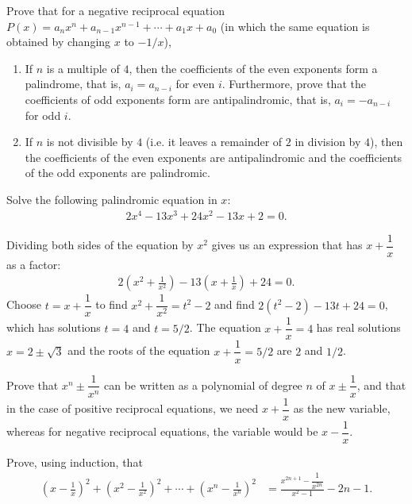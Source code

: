\documentclass[12pt,a4paper]{memoir}
\theoremstyle{definition}
\begin{document}
	\begin{question}
		Prove that for a negative reciprocal equation $P(x)=a_nx^n+a_{n-1}x^{n-1}+\cdots+a_1x+a_0$ (in which the same equation is obtained by changing $x$ to $-1/x$),
		\begin{enumerate}
			\item If $n$ is a multiple of $4$, then the coefficients of the even exponents form a palindrome, that is, $a_i=a_{n-i}$ for even $i$. Furthermore, prove that the coefficients of odd exponents form are antipalindromic, that is, $a_i=-a_{n-i}$ for odd $i$.
			\item If $n$ is not divisible by $4$ (i.e. it leaves a remainder of $2$ in division by $4$), then the coefficients of the even exponents are antipalindromic and the coefficients of the odd exponents are palindromic.
		\end{enumerate}
	\end{question}



\begin{question}
	Solve the following palindromic equation in $x$:
	\begin{align*}
		2x^4-13x^3+24x^2-13x+2=0.
	\end{align*}
\end{question}

\begin{solution}
	Dividing both sides of the equation by $x^2$ gives us an expression that has $x+\dfrac{1}{x}$ as a factor:
	\begin{align*}
		2\left(x^2+\frac{1}{x^2}\right) - 13\left(x+\frac{1}{x}\right) + 24 = 0.
	\end{align*}
	Choose $t=x+\dfrac{1}{x}$ to find $x^2+\dfrac{1}{x^2}=t^2-2$ and find $2(t^2-2)-13t+24=0$, which has solutions $t=4$ and $t=5/2$. The equation $x+\dfrac{1}{x}=4$ has real solutions $x=2\pm \sqrt 3$ and the roots of the equation $x+\dfrac{1}{x}=5/2$ are $2$ and $1/2$. 
\end{solution}


\begin{question}
	Prove that $x^n\pm\dfrac{1}{x^n}$ can be written as a polynomial of degree $n$ of $x\pm \dfrac{1}{x}$, and that in the case of positive reciprocal equations, we need $x+\dfrac{1}{x}$ as the new variable, whereas for negative reciprocal equations, the variable would be $x-\dfrac{1}{x}$.
\end{question}

\begin{question}
	Prove, using induction, that
	\begin{align*}
		\left(x-\frac{1}{x}\right)^2 + \left(x^2-\frac{1}{x^2}\right)^2 + \cdots + \left(x^n-\frac{1}{x^n}\right)^2 &= \frac{x^{2n+1}-\dfrac{1}{x^{2n}}}{x^2-1} - 2n-1.
	\end{align*}
\end{question}
\end{document}
